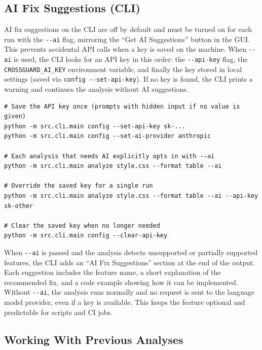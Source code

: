 \subsection{AI Fix Suggestions (CLI)}

AI fix suggestions on the CLI are off by default and must be turned on for each run with the \texttt{-{}-ai} flag, mirroring the ``Get AI Suggestions'' button in the GUI. This prevents accidental API calls when a key is saved on the machine. When \texttt{-{}-ai} is used, the CLI looks for an API key in this order: the \texttt{-{}-api-key} flag, the \texttt{CROSSGUARD\_AI\_KEY} environment variable, and finally the key stored in local settings (saved via \texttt{config -{}-set-api-key}). If no key is found, the CLI prints a warning and continues the analysis without AI suggestions.

\begin{lstlisting}[caption={Enable AI fix suggestions per run with \texttt{-{}-ai}}, label=src:ai-cli, basicstyle=\ttfamily\small, breaklines=true]
# Save the API key once (prompts with hidden input if no value is given)
python -m src.cli.main config --set-api-key sk-...
python -m src.cli.main config --set-ai-provider anthropic

# Each analysis that needs AI explicitly opts in with --ai
python -m src.cli.main analyze style.css --format table --ai

# Override the saved key for a single run
python -m src.cli.main analyze style.css --format table --ai --api-key sk-other

# Clear the saved key when no longer needed
python -m src.cli.main config --clear-api-key
\end{lstlisting}

When \texttt{-{}-ai} is passed and the analysis detects unsupported or partially supported features, the CLI adds an ``AI Fix Suggestions'' section at the end of the output. Each suggestion includes the feature name, a short explanation of the recommended fix, and a code example showing how it can be implemented. Without \texttt{-{}-ai}, the analysis runs normally and no request is sent to the language model provider, even if a key is available. This keeps the feature optional and predictable for scripts and CI jobs.



\subsection{Working With Previous Analyses}

